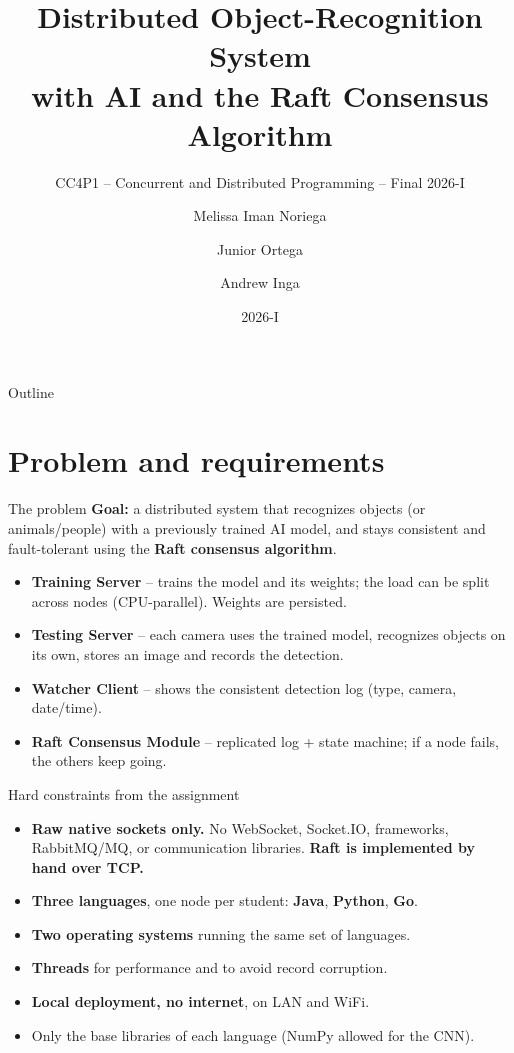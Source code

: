 \documentclass[aspectratio=169,11pt]{beamer}
\title[Distributed AI Recognition + Raft]{Distributed Object-Recognition System\\with AI and the Raft Consensus Algorithm}
\subtitle{CC4P1 -- Concurrent and Distributed Programming -- Final 2026-I}
\author[Iman, Ortega, Inga]{Melissa Iman Noriega \and Junior Ortega \and Andrew Inga}
\institute[UNI-FC]{School of Computer Science -- Faculty of Sciences -- UNI}
\date{2026-I}
\begin{document}
\begin{frame}[plain]\titlepage\end{frame}

\begin{frame}{Outline}
\tableofcontents
\end{frame}

\section{Problem and requirements}

\begin{frame}{The problem}
\textbf{Goal:} a distributed system that recognizes objects (or animals/people)
with a previously trained AI model, and stays consistent and fault-tolerant
using the \textbf{Raft consensus algorithm}.
\vspace{0.4em}
\begin{itemize}
  \item \textbf{Training Server} -- trains the model and its weights; the load can
  be split across nodes (CPU-parallel). Weights are persisted.
  \item \textbf{Testing Server} -- each camera uses the trained model, recognizes
  objects on its own, stores an image and records the detection.
  \item \textbf{Watcher Client} -- shows the consistent detection log
  (type, camera, date/time).
  \item \textbf{Raft Consensus Module} -- replicated log + state machine; if a node
  fails, the others keep going.
\end{itemize}
\end{frame}

\begin{frame}{Hard constraints from the assignment}
\begin{itemize}
  \item \textbf{Raw native sockets only.} No WebSocket, Socket.IO, frameworks,
  RabbitMQ/MQ, or communication libraries. \textbf{Raft is implemented by hand over TCP.}
  \item \textbf{Three languages}, one node per student:
  \textbf{Java}, \textbf{Python}, \textbf{Go}.
  \item \textbf{Two operating systems} running the same set of languages.
  \item \textbf{Threads} for performance and to avoid record corruption.
  \item \textbf{Local deployment, no internet}, on LAN and WiFi.
  \item Only the base libraries of each language (NumPy allowed for the CNN).
\end{itemize}
\end{frame}
\end{document}
